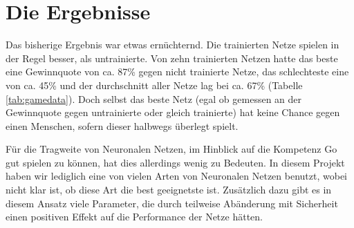\section{Die Ergebnisse}
Das bisherige Ergebnis war etwas ernüchternd. Die trainierten Netze spielen in
der Regel besser, als untrainierte. Von zehn trainierten Netzen hatte das beste 
eine Gewinnquote von ca. 87\% gegen nicht trainierte Netze, das schlechteste
eine von ca. 45\% und der durchschnitt aller Netze lag bei ca. 67\% (Tabelle \ref{tab:gamedata}).
Doch selbst das beste Netz (egal ob gemessen an der Gewinnquote gegen 
untrainierte oder gleich trainierte) hat keine Chance gegen einen Menschen, 
sofern dieser halbwegs überlegt spielt.

Für die Tragweite von Neuronalen Netzen, im Hinblick auf die Kompetenz Go gut
spielen zu können, hat dies allerdings wenig zu Bedeuten. In diesem Projekt
haben wir lediglich eine von vielen Arten von Neuronalen Netzen benutzt, wobei
nicht klar ist, ob diese Art die best geeignetste ist. Zusätzlich dazu gibt es
in diesem Ansatz viele Parameter, die durch teilweise Abänderung mit Sicherheit 
einen positiven Effekt auf die Performance der Netze hätten. 